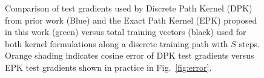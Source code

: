 \begin{figure}[!ht]
\begin{tikzpicture}[scale=0.72]
    

\end{tikzpicture}
\caption{Comparison of test gradients used by Discrete Path Kernel (DPK) from prior work (Blue) and the Exact Path Kernel (EPK) proposed in this work (green) versus total training vectors (black) used for both kernel formulations along a discrete training path with $S$ steps. Orange shading indicates cosine error of DPK test gradients versus EPK test gradients shown in practice in Fig.~\ref{fig:error}. }
\label{fig:vecs}
\end{figure}

